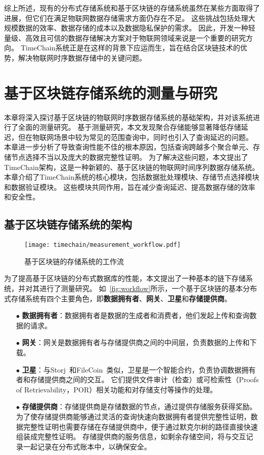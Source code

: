 综上所述，现有的分布式存储系统和基于区块链的存储系统虽然在某些方面取得了进展，但它们在满足物联网数据存储需求方面仍存在不足。
这些挑战包括处理大规模数据的效率、数据存储的成本以及数据隐私保护的需求。
因此，开发一种轻量级、高效且可信的数据存储解决方案对于物联网领域来说是一个重要的研究方向。
TimeChain系统正是在这样的背景下应运而生，旨在结合区块链技术的优势，解决物联网时序数据存储中的关键问题。

\chapter{基于区块链存储系统的测量与研究}
\label{sec:baseline}
本章将深入探讨基于区块链的物联网时序数据存储系统的基础架构，并对该系统进行了全面的测量研究。
基于测量研究，本文发现聚合存储能够显著降低存储延迟，但在物联网场景中较为常见的范围查询中，同时也引入了查询延迟的问题。
本章进一步分析了导致查询性能不佳的根本原因，包括查询跨越多个聚合单元、存储节点选择不当以及庞大的数据完整性证明。
为了解决这些问题，本文提出了TimeChain架构，这是一种新颖的、基于区块链的物联网时间序列数据存储系统。
本章介绍了TimeChain系统的核心模块，包括数据批处理模块、存储节点选择模块和数据验证模块。
这些模块共同作用，旨在减少查询延迟、提高数据存储的效率和安全性。

\section{基于区块链存储系统的架构}

\begin{figure}[t]
    \centering
    \texttt{[image: timechain/measurement\_workflow.pdf]}
    \caption{基于区块链的存储系统的工作流}
    \label{fig:workflow}
\end{figure}

为了提高基于区块链的分布式数据库的性能，本文提出了一种基本的链下存储系统，并对其进行了测量研究。
如~\autoref{fig:workflow}所示，一个基于区块链的基本分布式存储系统有四个主要角色，即\textbf{数据拥有者}、\textbf{网关}、\textbf{卫星}和\textbf{存储提供商}。

\begin{itemize}
    \item[$\bullet$] \textbf{数据拥有者}：数据拥有者是数据的生成者和消费者，他们发起上传和查询数据的请求。
    \item[$\bullet$] \textbf{网关}：网关是数据拥有者与存储提供商之间的中间层，负责数据的上传和下载。
    \item[$\bullet$] \textbf{卫星}：与Storj~\cite{storj2018storj}和FileCoin~\cite{bauer2022filecoin}类似，卫星是一个智能合约，负责协调数据拥有者和存储提供商之间的交互。
    它们提供文件审计（检查）或可检索性（Proofs of Retrievability，POR）相关功能和对存储支付等操作的处理。
    \item[$\bullet$] \textbf{存储提供商}：存储提供商是存储数据的节点，通过提供存储服务获得奖励。
    为了使存储提供商能够通过灵活的查询快速向数据拥有者提供完整性证明，数据完整性证明也需要存储在存储提供商中，便于通过默克尔树的路径直接快速组装成完整性证明。
    存储提供商的服务信息，如剩余存储空间，将与交互记录一起记录在分布式账本中，以确保安全。
\end{itemize}

